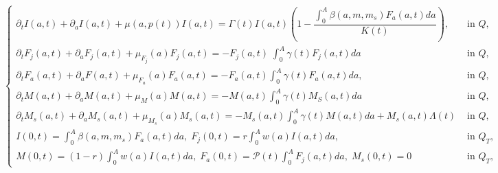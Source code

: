 \documentclass[10pt, a4paper]{amsart}
\theoremstyle{plain}
\theoremstyle{definition}
\theoremstyle{remark}
\numberwithin{equation}{section}
\newcommand{\I}{\mathbb{I}}
\begin{document}
\begin{equation}\label{eq3.2}
\left\lbrace 
\begin{array}{ll}
\partial_tI(a,t)+\partial_aI(a,t)+\mu(a,p(t))I(a,t)=\Gamma(t) I(a,t)\left(1-\dfrac{\displaystyle\int_{0}^A\beta(a,m,m_s) F_a(a,t)da}{K(t)}\right), &\text{ in }Q, 
\\\partial_tF_j(a,t)+\partial_aF_j(a,t)+\mu_{F_j}(a)F_j(a,t)=-F_j(a,t)\;\displaystyle\int_{0}^A\gamma(t) F_j(a,t)da &\text{ in }Q, 
\\\partial_tF_a(a,t)+\partial_aF(a,t)+\mu_{F_a}(a)F_a(a,t)=-F_a(a,t)\displaystyle\int_{0}^A\gamma (t)F_a(a,t)da, &\text{ in }Q,
\\\partial_tM(a,t)+\partial_aM(a,t)+\mu_M(a)M(a,t)=-M(a,t)\displaystyle\int_{0}^A\gamma(t) M_S(a,t)da &\text{ in }Q,
\\\partial_tM_s(a,t)+\partial_aM_s(a,t)+\mu_{M_s}(a)M_s(a,t)=-M_s(a,t)\displaystyle\int_{0}^A\gamma(t) M(a,t)da +M_s(a,t)\Lambda(t) &\text{ in }Q,
\\I(0,t)=\displaystyle\int_{0}^A\beta(a,m,m_s)F_a(a,t)da,\; F_j(0,t)=r\displaystyle\int_{0}^Aw(a)I(a,t)da,&\text{ in }Q_T,
\\M(0,t)=(1-r)\displaystyle\int_{0}^Aw(a)I(a,t)da,\;F_a(0,t)=\mathcal{P}(t)\displaystyle\int_0^AF_j(a,t)da,\;M_s(0,t)=0 &\text{ in }Q_T,
\end{array}
\right.
\end{equation}
\end{document}

